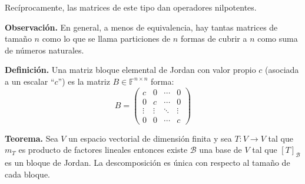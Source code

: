 Recíprocamente, las matrices de este tipo dan operadores nilpotentes.

\textbf{Observación.} En general, a menos de equivalencia,
hay tantas matrices de tamaño $n$ como lo que se llama particiones
de $n$ formas de cubrir a $n$ como suma de números naturales.


\textbf{Definición.} Una matriz bloque elemental de Jordan
con valor propio $c$ (asociada a un escalar ``$c$'') es la
matriz $B \in \mathbb{F}^{n\times n}$ forma:
\begin{equation}B=\left(
	\begin{matrix}
		c      & 0      & \cdots & 0      \\
		0      & c      & \cdots & 0      \\
		\vdots & \vdots & \ddots & \vdots \\
		0      & 0      & \cdots & c      
	\end{matrix}\right)
\end{equation} 

\textbf{Teorema.} Sea $V$ un espacio vectorial de dimensión finita
y sea $T:V \to V$ tal que $m_T$ es producto de factores lineales
entonces existe $\mathcal{B}$ una base de $V$ tal que $[T]_{\mathcal{B}}$
es un bloque de Jordan. La descomposición es única con respecto
al tamaño de cada bloque.